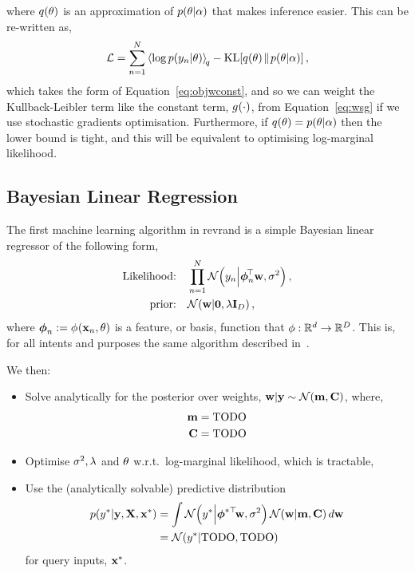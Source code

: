 \documentclass[11pt, oneside]{article}
\begin{document}
where $q\!\left({\theta}\right)$ is an approximation of $p\!\left({\theta}\middle\vert{\ensuremath{\alpha}}\right)$ that 
makes inference easier. This can be re-written as,
\begin{equation}
    \elbo = \sum^N_{n=1} \expec{q}{\log\probC{\targs_n}{\param}} -
    \KL{\qrob{\param}}{\probC{\param}{\hyper}},
    \label{eq:elbo}
\end{equation}
which takes the form of Equation~\eqref{eq:objwconst}, and so we can weight the
Kullback-Leibler term like the constant term, ${g}_{}\!\left({{\cdot}}\right)$, from
Equation~\eqref{eq:wsg} if we use stochastic gradients optimisation.
Furthermore, if $q\!\left({\theta}\right) = p\!\left({\theta}\middle\vert{\ensuremath{\alpha}}\right)$ then the lower bound
is tight, and this will be equivalent to optimising log-marginal likelihood.


\subsection{Bayesian Linear Regression}

The first machine learning algorithm in revrand is a simple Bayesian linear
regressor of the following form,
\begin{align}
    \text{Likelihood:} \quad &\prod^N_{n=1} 
    \mathcal{N}\!\left({y_n}\middle\vert{\ensuremath{\boldsymbol\phi}_n\ensuremath{^{\!\top}}\ensuremath{\mathbf{w}}, \ensuremath{\sigma^2}}\right), \\
    \text{prior:} \quad &\mathcal{N}\!\left({\mathbf{w}}\middle\vert{\mathbf{0}, \ensuremath{\lambda}\ensuremath{\mathbf{I}_{D}}}\right),
\end{align}
where $\boldsymbol\phi_n := {\phi}_{}\!\left({{\mathbf{x}_n, \theta}}\right)$ is a feature, or
basis, function that $\phi: \mathbb{R}^{d} \to \mathbb{R}^{D}$. This is, for all
intents and purposes the same algorithm described in~\cite[Chapter
2]{Rasmussen2006}.

We then:
\begin{itemize}
    \item Solve analytically for the posterior over weights, $\mathbf{w} | \mathbf{y}
        \sim \mathcal{N}\!\left({\mathbf{m}, \mathbf{C}}\right)$, where,
        \begin{align*}
            \mathbf{m} &= \text{TODO} \\
            \mathbf{C} &= \text{TODO}
        \end{align*}
    \item Optimise $\sigma^2, \lambda$ and $\theta$ w.r.t.\ log-marginal likelihood,
        which is tractable,
    \item Use the (analytically solvable) predictive distribution
        \begin{align}
            p\!\left({y^{*}}\middle\vert{\ensuremath{\mathbf{y}}, \ensuremath{\mathbf{X}}, \ensuremath{\mathbf{x}}\ensuremath{^{*}}}\right) &= \int
            \mathcal{N}\!\left({y^{*}}\middle\vert{\ensuremath{\boldsymbol\phi}\ensuremath{^{*\top}\!}\ensuremath{\mathbf{w}}, \ensuremath{\sigma^2}}\right)
            \mathcal{N}\!\left({\mathbf{w}}\middle\vert{\ensuremath{\mathbf{m}}, \ensuremath{\mathbf{C}}}\right) d\mathbf{w} \nonumber \\
            &= \mathcal{N}\!\left({y^{*}}\middle\vert{\text{TODO}, \text{TODO}}\right)
        \end{align}
        for query inputs, $\mathbf{x}^{*}$.
\end{itemize}
\end{document}
